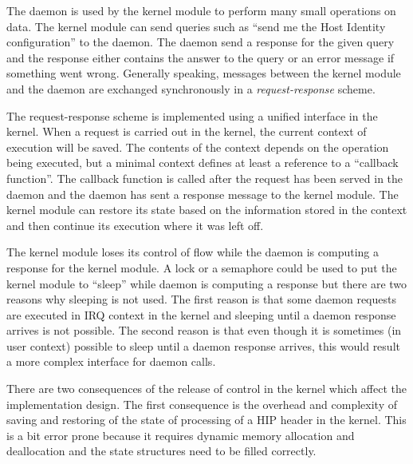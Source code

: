 The daemon is used by the kernel module to perform many small
operations on data. The kernel module can send queries such as ``send
me the Host Identity configuration'' to the daemon. The daemon send a
response for the given query and the response either contains the
answer to the query or an error message if something went
wrong. Generally speaking, messages between the kernel module and the
daemon are exchanged synchronously in a \textit{request-response}
scheme.

The request-response scheme is implemented using a unified interface
in the kernel. When a request is carried out in the kernel, the
current context of execution will be saved. The contents of the
context depends on the operation being executed, but a minimal context
defines at least a reference to a ``callback function''. The callback
function is called after the request has been served in the daemon and
the daemon has sent a response message to the kernel module. The
kernel module can restore its state based on the information stored in
the context and then continue its execution where it was left off.

The kernel module loses its control of flow while the daemon is
computing a response for the kernel module. A lock or a semaphore
could be used to put the kernel module to ``sleep'' while daemon is
computing a response but there are two reasons why sleeping is not
used. The first reason is that some daemon requests are executed in
IRQ context in the kernel and sleeping until a daemon response arrives
is not possible. The second reason is that even though it is sometimes
(in user context) possible to sleep until a daemon response arrives,
this would result a more complex interface for daemon calls.

There are two consequences of the release of control in the kernel
which affect the implementation design. The first consequence is the
overhead and complexity of saving and restoring of the state of
processing of a HIP header in the kernel. This is a bit error prone
because it requires dynamic memory allocation and deallocation and the
state structures need to be filled correctly.


